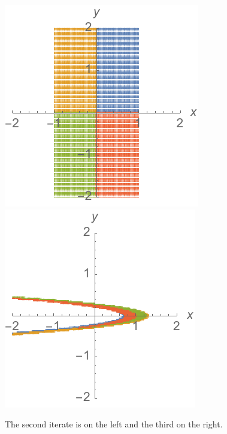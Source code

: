 \documentclass[12pt,letterpaper,noanswers]{exam}
\begin{document}
\includegraphics{img/20191125-p1a.pdf}
\includegraphics{img/20191125-p1b.pdf}

The second iterate is on the left and the third on the right.
\end{document}
